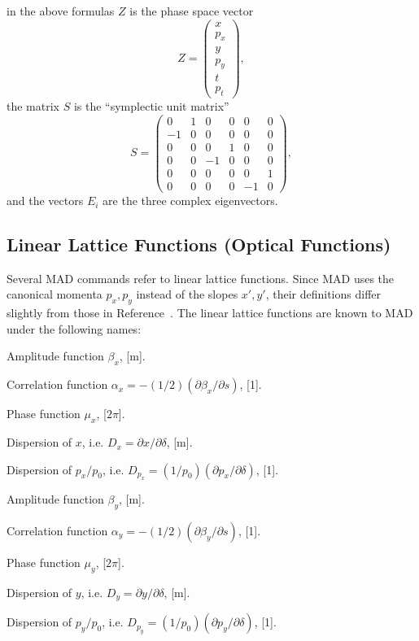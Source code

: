 in the above formulas \(Z\) is the phase space vector
\[
Z = \left(
\begin{array}{l} x \\ p_x \\ y \\ p_y \\ t \\ p_t
\end{array} \right),
\]
the matrix \(S\) is the ``symplectic unit matrix''
\[
S = \left( \begin{array}{cccccc}
 0 & 1 & 0 & 0 & 0 & 0 \\
-1 & 0 & 0 & 0 & 0 & 0 \\
 0 & 0 & 0 & 1 & 0 & 0 \\
 0 & 0 &-1 & 0 & 0 & 0 \\
 0 & 0 & 0 & 0 & 0 & 1 \\
 0 & 0 & 0 & 0 &-1 & 0
\end{array} \right ),
\]
and the vectors \(E_i\) are the three complex eigenvectors.
 
 
\subsection{Linear Lattice Functions (Optical Functions)}
\label{S-LINLAT}
Several MAD commands refer to linear lattice functions.
Since MAD uses the canonical momenta \(p_{x}, p_{y}\)
instead of the slopes \(x', y'\),
their definitions differ slightly from those
in Reference~\cite{B-COU58}.
The linear lattice functions are known to MAD under the following names:
 
\begin{mylist}
Amplitude function \(\beta_{x}\), [m].
 
Correlation function
\(\alpha_{x}=-(1/2)(\partial\beta_{x}/\partial s)\), [1].
 
Phase function \(\mu_{x}\), [\(2\pi\)].
 
Dispersion of \(x\), i.e.
\(D_{x}=\partial x/\partial\delta\), [m].
 
Dispersion of \(p_{x}/p_{0}\), i.e.
\(D_{p_{x}}=(1/p_{0})(\partial p_{x}/\partial\delta)\), [1].
 
Amplitude function \(\beta_{y}\), [m].
 
Correlation function
\(\alpha_{y}=-(1/2)(\partial\beta_{y}/\partial s)\), [1].
 
Phase function \(\mu_{y}\), [\(2\pi\)].
 
Dispersion of \(y\), i.e.
\(D_{y}=\partial y/\partial\delta\), [m].
 
Dispersion of \(p_{y}/p_{0}\), i.e.
\(D_{p_{y}}=(1/p_{0})(\partial p_{y}/\partial\delta)\), [1].
\end{mylist}
 
